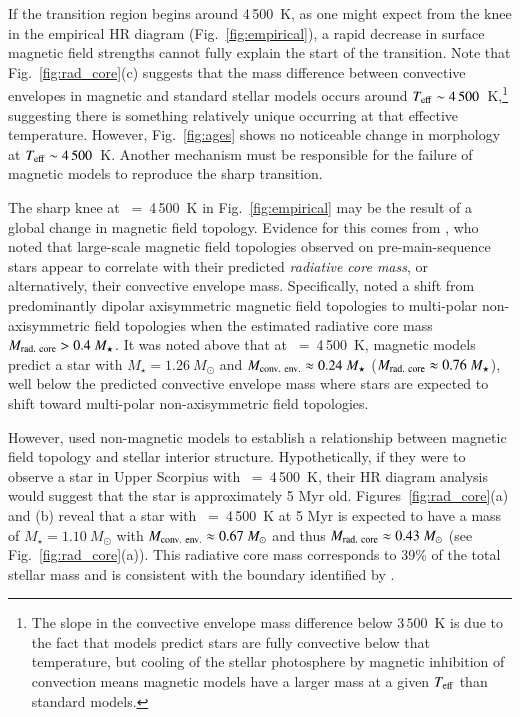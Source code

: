 \documentclass{aa}
\begin{document}
If the transition region begins around 4\,500~K, as one might expect from the knee in the empirical HR diagram (Fig.~\ref{fig:empirical}), a rapid decrease in surface magnetic field strengths cannot fully explain the start of the transition. Note that Fig.~\ref{fig:rad_core}(c) suggests that the mass difference between convective envelopes in magnetic and standard stellar models occurs around $T_{\rm eff} \sim 4\,500$~K,\footnote{The slope in the convective envelope mass difference below $3\,500$~K is due to the fact that models predict stars are fully convective below that temperature, but cooling of the stellar photosphere by magnetic inhibition of convection means magnetic models have a larger mass at a given $T_{\rm eff}$ than standard models.} suggesting there is something relatively unique occurring at that effective temperature. However, Fig.~\ref{fig:ages} shows no noticeable change in morphology at  $T_{\rm eff} \sim 4\,500$~K. Another mechanism must be responsible for the failure of magnetic models to reproduce the sharp transition.

The sharp knee at \teff~=~4\,500~K in Fig.~\ref{fig:empirical} may be the result of a global change in magnetic field topology. Evidence for this comes from \citet{Gregory2012}, who noted that large-scale magnetic field topologies observed on pre-main-sequence stars appear to correlate with their predicted \emph{radiative core mass}, or alternatively, their convective envelope mass. Specifically, \citet{Gregory2012} noted a shift from predominantly dipolar axisymmetric magnetic field topologies to multi-polar non-axisymmetric field topologies when the estimated radiative core mass $M_{\rm rad.\ core} > 0.4\ M_\star$. It was noted above that at \teff~=~4\,500~K, magnetic models predict a star with $M_{\star} = 1.26\ M_{\odot}$ and $M_{\rm conv.\ env.} \approx 0.24\ M_{\star}$ ($M_{\rm rad.\ core} \approx 0.76\ M_{\star}$), well below the predicted convective envelope mass where stars are expected to shift toward multi-polar non-axisymmetric field topologies.

However, \citet{Gregory2012} used non-magnetic models \citep{Siess2000} to establish a relationship between magnetic field topology and stellar interior structure. Hypothetically, if they were to observe a star in Upper Scorpius with \teff~=~4\,500~K, their HR diagram analysis would suggest that the star is approximately 5 Myr old. Figures~\ref{fig:rad_core}(a) and (b) reveal that a star with \teff~=~4\,500~K at 5 Myr is expected to have a mass of $M_{\star} = 1.10\ M_{\odot}$ with $M_{\rm conv.\ env.} \approx 0.67\ M_{\odot}$ and thus $M_{\rm rad.\ core} \approx 0.43\ M_{\odot}$ (see Fig.~\ref{fig:rad_core}(a)). This radiative core mass corresponds to 39\% of the total stellar mass and is consistent with the boundary identified by \citet{Gregory2012}.
\end{document}

